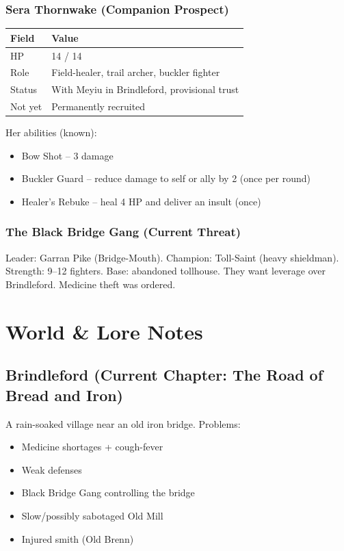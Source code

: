 \documentclass[11pt,a4paper]{article}
\begin{document}
\subsubsection*{Sera Thornwake (Companion Prospect)}

\begin{longtable}{ll}
\toprule
\textbf{Field} & \textbf{Value} \\
\midrule
\endhead
HP & 14 / 14 \\
Role & Field-healer, trail archer, buckler fighter \\
Status & With Meyiu in Brindleford, provisional trust \\
Not yet & Permanently recruited \\
\bottomrule
\end{longtable}

Her abilities (known):
\begin{itemize}
  \item Bow Shot -- 3 damage
  \item Buckler Guard -- reduce damage to self or ally by 2 (once per round)
  \item Healer's Rebuke -- heal 4 HP and deliver an insult (once)
\end{itemize}

\subsubsection*{The Black Bridge Gang (Current Threat)}

Leader: Garran Pike (Bridge-Mouth). Champion: Toll-Saint (heavy shieldman). Strength: 9--12 fighters. Base: abandoned tollhouse. They want leverage over Brindleford. Medicine theft was ordered.

\section{World \& Lore Notes}

\subsection{Brindleford (Current Chapter: The Road of Bread and Iron)}

A rain-soaked village near an old iron bridge. Problems:
\begin{itemize}
  \item Medicine shortages + cough-fever
  \item Weak defenses
  \item Black Bridge Gang controlling the bridge
  \item Slow/possibly sabotaged Old Mill
  \item Injured smith (Old Brenn)
\end{itemize}
\end{document}
